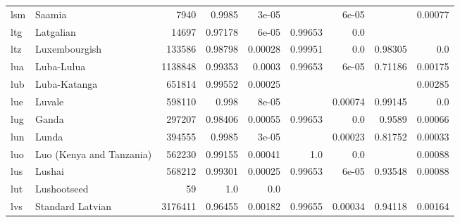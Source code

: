\documentclass[11pt]{article}
\begin{document}
\begin{table*}[h]
{\begin{tabular}{llrrrrrrr}
lsm         & Saamia         & 7940         & 0.9985         & 3e-05         &          & 6e-05         &          & 0.00077         \\

ltg         & Latgalian         & 14697         & 0.97178         & 6e-05         & 0.99653         & 0.0         &          &          \\

ltz         & Luxembourgish         & 133586         & 0.98798         & 0.00028         & 0.99951         & 0.0         & 0.98305         & 0.0         \\

lua         & Luba-Lulua         & 1138848         & 0.99353         & 0.0003         & 0.99653         & 6e-05         & 0.71186         & 0.00175         \\

lub         & Luba-Katanga         & 651814         & 0.99552         & 0.00025         &          &          &          & 0.00285         \\

lue         & Luvale         & 598110         & 0.998         & 8e-05         &          & 0.00074         & 0.99145         & 0.0         \\

lug         & Ganda         & 297207         & 0.98406         & 0.00055         & 0.99653         & 0.0         & 0.9589         & 0.00066         \\

lun         & Lunda         & 394555         & 0.9985         & 3e-05         &          & 0.00023         & 0.81752         & 0.00033         \\

luo         & Luo (Kenya and Tanzania)         & 562230         & 0.99155         & 0.00041         & 1.0         & 0.0         &          & 0.00088         \\

lus         & Lushai         & 568212         & 0.99301         & 0.00025         & 0.99653         & 6e-05         & 0.93548         & 0.00088         \\

lut         & Lushootseed         & 59         & 1.0         & 0.0         &          &          &          &          \\

lvs         & Standard Latvian         & 3176411         & 0.96455         & 0.00182         & 0.99655         & 0.00034         & 0.94118         & 0.00164         \\


\end{tabular}}
\end{table*}
\end{document}
